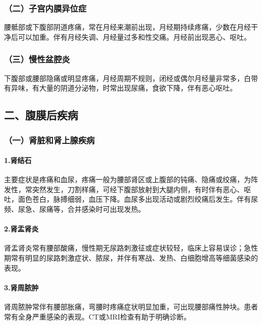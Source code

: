 \subsubsection{（二）子宫内膜异位症}

腰骶部或下腹部阴道疼痛，常在月经来潮前出现，月经期持续疼痛，少数在月经干净后可以加重。伴有月经失调、月经量过多和性交痛。月经前出现恶心、呕吐。

\subsubsection{（三）慢性盆腔炎}

下腹部或腰部隐痛或明显疼痛，月经周期不规则，闭经或偶尔月经量非常多，白带有异味，有大量的阴道分泌物，时常出现尿痛，食欲下降，伴有恶心呕吐。

\subsection{二、腹膜后疾病}

\subsubsection{（一）肾脏和肾上腺疾病}

\paragraph{1.肾结石}

主要症状是疼痛和血尿，疼痛一般为腰部肾区或上腹部的钝痛、隐痛或绞痛，为阵发性，常突然发生，刀割样痛，可经下腹部放射到大腿内侧，有时伴有恶心、呕吐，面色苍白，脉搏细弱，血压下降。血尿多出现活动或剧烈绞痛后发生。伴有尿频、尿急、尿痛等，合并感染时可出现发热。

\paragraph{2.肾盂肾炎}

肾盂肾炎常有腰部酸痛，慢性期无尿路刺激征或症状较轻，临床上容易误诊；急性期常有明显的尿路刺激症状、脓尿，并伴有寒战、发热、白细胞增高等细菌感染的表现。

\paragraph{3.肾周脓肿}

肾周脓肿常伴有腰部胀痛，弯腰时疼痛症状明显加重，可出现腰部痛性肿块。患者常有全身严重感染的表现。CT或MRI检查有助于明确诊断。

